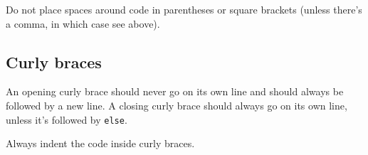 Do not place spaces around code in parentheses or square brackets
(unless there's a comma, in which case see above).

\begin{Shaded}
\begin{Highlighting}[]
\NormalTok{diamonds[}\NormalTok{, ]}

\NormalTok{x[}\NormalTok{,]   }
\NormalTok{x[} \NormalTok{,]  }
\end{Highlighting}
\end{Shaded}

\subsection{Curly braces}

An opening curly brace should never go on its own line and should always
be followed by a new line. A closing curly brace should always go on its
own line, unless it's followed by \texttt{else}.

Always indent the code inside curly braces.

\begin{Shaded}
\begin{Highlighting}[]

\StringTok{ } \NormalTok{&&}\StringTok{ }
  \NormalTok{(}\NormalTok{)}
\NormalTok{\}}

\StringTok{ }\NormalTok{) \{}
  \StringTok{ }
\NormalTok{\}}


\StringTok{ } \NormalTok{&&}\StringTok{ }
\NormalTok{(}\NormalTok{)}

\StringTok{ }\NormalTok{) \{}
\NormalTok{\} }
  \StringTok{ }
\NormalTok{\}}
\end{Highlighting}
\end{Shaded}

